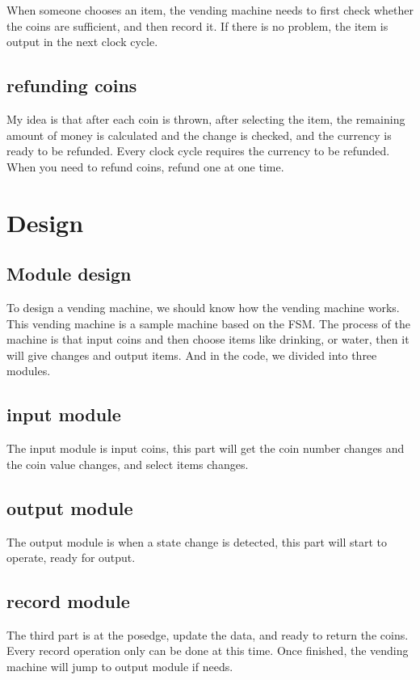 \documentclass[12pt,a4paper]{article}
\begin{document}
When someone chooses an item, the vending machine needs to first check whether the coins are sufficient, and then record it. 
If there is no problem, the item is output in the next clock cycle.

\subsection{refunding coins}

My idea is that after each coin is thrown, after selecting the item, the remaining amount of money is calculated and the change is checked, and the currency is ready to be refunded. 
Every clock cycle requires the currency to be refunded.
When you need to refund coins, refund one at one time.

\newpage

\section{Design}
\subsection{Module design}

To design a vending machine, we should know how the vending machine works.
This vending machine is a sample machine based on the FSM.
The process of the machine is that input coins and then choose items like drinking, or water, then it will give changes and output items.
And in the code, we divided into three modules. 

\subsection{input module}
The input module is input coins, this part will get the coin number changes and the coin value changes, and select items changes.

\subsection{output module}
The output module is when a state change is detected, this part will start to operate, ready for output.

\subsection{record module}

The third part is at the posedge, update the data, and ready to return the coins. 
Every record operation only can be done at this time.
Once finished, the vending machine will jump to output module if needs.
\end{document}
